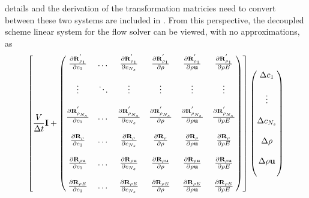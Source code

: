 details and the derivation of the transformation matricies need to convert
between these two systems are included in .  From
this perspective, the decoupled scheme linear system for the flow solver can be
viewed, with no approximations, as
\begin{equation}
  \left[ 
    \frac{V}{\Delta t} \mi + 
    \begin{pmatrix}
      \rpdiff{\rho_1}{c_1}      & \dots  & \rpdiff{\rho_1}{c_{N_s}}     & \rpdiff{\rho_1}{\rho}     & \rpdiff{\rho_1}{\rho \vu}     &  \rpdiff{\rho_1}{\rho E}  \\ \\
      \vdots                    & \ddots & \vdots                       & \vdots                    & \vdots                        & \vdots                    \\ \\
      \rpdiff{\rho_{N_s}}{c_1}  & \dots  & \rpdiff{\rho_{N_s}}{c_{N_s}} & \rpdiff{\rho_{N_s}}{\rho} & \rpdiff{\rho_{N_s}}{\rho \vu} &  \rpdiff{\rho_{N_s}}{\rho E}    \\ \\
      \rdiff{\rho}{c_1}         & \dots  & \rdiff{\rho}{c_{N_s}}        & \rdiff{\rho}{\rho}        & \rdiff{\rho}{\rho \vu}        &  \rdiff{\rho}{\rho E}     \\ \\
      \rdiff{\rho \vu}{c_1}     & \dots  & \rdiff{\rho \vu}{c_{N_s}}    & \rdiff{\rho \vu}{\rho}    & \rdiff{\rho \vu}{\rho \vu}    &  \rdiff{\rho \vu}{\rho E} \\ \\
      \rdiff{\rho E}{c_1}       & \dots  & \rdiff{\rho E}{c_{N_s}}      & \rdiff{\rho E}{\rho}      & \rdiff{\rho E}{\rho \vu}      &  \rdiff{\rho E}{\rho E}
    \end{pmatrix}
  \right]
  \begin{pmatrix}
    \Delta c_1      \\ \\
    \vdots     \\ \\
    \Delta c_{N_s}  \\ \\
    \Delta \rho     \\ \\
    \Delta \rho \vu \\ \\

\end{pmatrix}
\end{equation}

